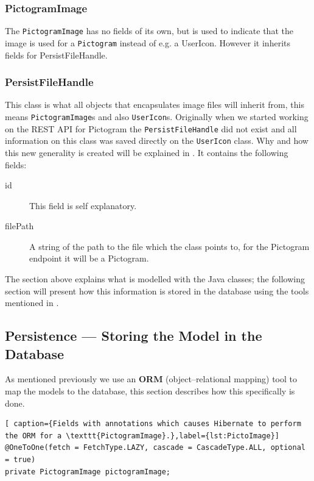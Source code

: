 \subsubsection*{PictogramImage}
The \texttt{PictogramImage} has no fields of its own, but is used to indicate that the image is used for a \texttt{Pictogram} instead of e.g. a UserIcon.
However it inherits fields for PersistFileHandle.

\subsubsection*{PersistFileHandle}
This class is what all objects that encapsulates image files will inherit from, this means \texttt{PictogramImage}s and also \texttt{UserIcon}s.
Originally when we started working on the REST API for Pictogram the \texttt{PersistFileHandle} did not exist and all information on this class was saved directly on the \texttt{UserIcon} class.
Why and how this new generality is created will be explained in .
It contains the following fields:
\begin{description}
	\item[id] This field is self explanatory.
	\item[filePath] A string of the path to the file which the class points to, for the Pictogram endpoint it will be a Pictogram.
\end{description}

The section above explains what is modelled with the Java classes; the following section will present how this information is stored in the database using the tools mentioned in .

\subsection{Persistence --- Storing the Model in the Database}\label{subsec:pictomodelstore}

As mentioned previously we use an \textbf{ORM} (object--relational mapping) tool to map the models to the database, this section describes how this specifically is done.

\begin{lstlisting}[ caption={Fields with annotations which causes Hibernate to perform the ORM for a \texttt{PictogramImage}.},label={lst:PictoImage}]
@OneToOne(fetch = FetchType.LAZY, cascade = CascadeType.ALL, optional = true)
private PictogramImage pictogramImage;
\end{lstlisting}

